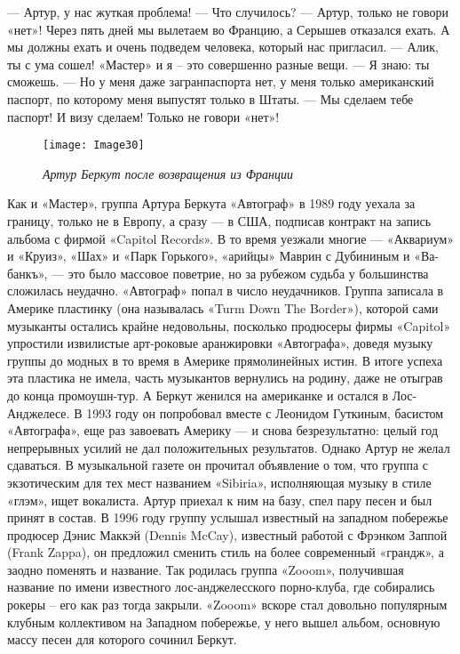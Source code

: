 \documentclass[16pt,a5paper,oneside]{book}
\begin{document}
— Артур, у нас жуткая проблема!
— Что случилось?
— Артур, только не говори «нет»! Через пять дней мы вылетаем во Францию, а Серышев отказался ехать. А мы должны ехать и
очень подведем человека, который нас пригласил.
— Алик, ты с ума сошел! «Мастер» и я – это совершенно разные вещи.
— Я знаю: ты сможешь.
— Но у меня даже загранпаспорта нет, у меня только американский паспорт, по которому меня выпустят только в Штаты.
— Мы сделаем тебе паспорт! И визу сделаем! Только не говори «нет»!

\begin{figure}
    \centering
    \texttt{[image: Image30]}
    \caption{\textit{Артур Беркут после возвращения из Франции}}
\end{figure}

Как и «Мастер», группа Артура Беркута «Автограф» в 1989 году уехала за границу, только не в Европу, а сразу — в США,
подписав контракт на запись альбома с фирмой «Capitol Records». В то время уезжали многие — «Аквариум» и «Круиз», «Шах»
и «Парк Горького», «арийцы» Маврин с Дубининым и «Ва-банкъ», — это было массовое поветрие, но за рубежом судьба у
большинства сложилась неудачно. «Автограф» попал в число неудачников. Группа записала в Америке пластинку (она
называлась «Turm Down The Border»), которой сами музыканты остались крайне недовольны, посколько продюсеры фирмы
«Capitol» упростили извилистые арт-роковые аранжировки «Автографа», доведя музыку группы до модных в то время в Америке
прямолинейных истин. В итоге успеха эта пластика не имела, часть музыкантов вернулись на родину, даже не отыграв до
конца промоушн-тур. А Беркут женился на американке и остался в Лос-Анджелесе. В 1993 году он попробовал вместе с
Леонидом Гуткиным, басистом «Автографа», еще раз завоевать Америку — и снова безрезультатно: целый год непрерывных
усилий не дал положительных результатов. Однако Артур не желал сдаваться. В музыкальной газете он прочитал объявление о
том, что группа с экзотическим для тех мест названием «Sibiria», исполняющая музыку в стиле «глэм», ищет вокалиста.
Артур приехал к ним на базу, спел пару песен и был принят в состав. В 1996 году группу услышал известный на западном
побережье продюсер Дэнис Маккэй (Dennis McCay), известный работой с Фрэнком Заппой (Frank Zappa), он предложил сменить
стиль на более современный «грандж», а заодно поменять и название. Так родилась группа «Zooom», получившая название по
имени известного лос-анджелесского порно-клуба, где собирались рокеры – его как раз тогда закрыли. «Zooom» вскоре стал
довольно популярным клубным коллективом на Западном побережье, у него вышел альбом, основную массу песен для которого
сочинил Беркут.
\end{document}
